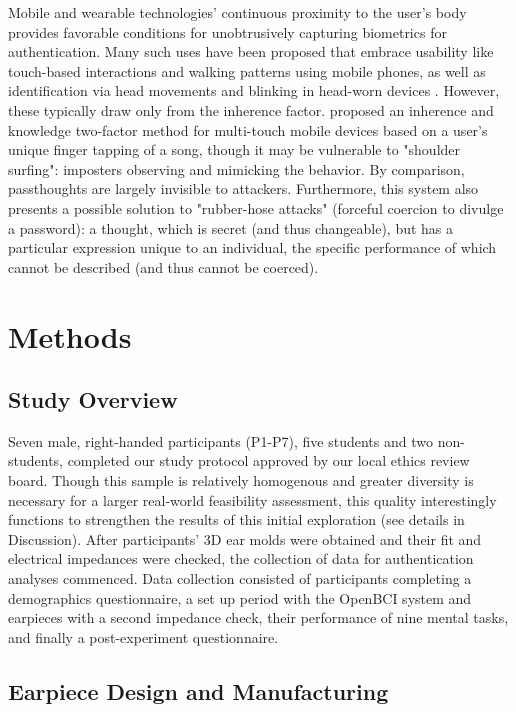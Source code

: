 \documentclass{sigchi}
\begin{document}
Mobile and wearable technologies' continuous proximity to the user's body provides favorable conditions for unobtrusively capturing biometrics for authentication. Many such uses have been proposed that embrace usability like touch-based interactions \cite{Tartz2015, Holz2015} and walking patterns \cite{Lu2014} using mobile phones, as well as identification via head movements and blinking in head-worn devices \cite{Rogers2015}. However, these typically draw only from the inherence factor. \cite{Chen2015} proposed an inherence and knowledge two-factor method for multi-touch mobile devices based on a user's unique finger tapping of a song, though it may be vulnerable to "shoulder surfing": imposters observing and mimicking the behavior. By comparison, passthoughts are largely invisible to attackers. Furthermore, this system also presents a possible solution to "rubber-hose attacks" (forceful coercion to divulge a password): a thought, which is secret (and thus changeable), but has a particular expression unique to an individual, the specific performance of which cannot be described (and thus cannot be coerced).

\section{Methods}

\subsection{Study Overview}

Seven male, right-handed participants (P1-P7), five students and two non-students, completed our study protocol approved by our local ethics review board. Though this sample is relatively homogenous and greater diversity is necessary for a larger real-world feasibility assessment, this quality interestingly functions to strengthen the results of this initial exploration (see details in Discussion). After participants' 3D ear molds were obtained and their fit and electrical impedances were checked, the collection of data for authentication analyses commenced. Data collection consisted of participants completing a demographics questionnaire, a set up period with the OpenBCI system and earpieces with a second impedance check, their performance of nine mental tasks, and finally a post-experiment questionnaire.

\subsection{Earpiece Design and Manufacturing}
\end{document}
